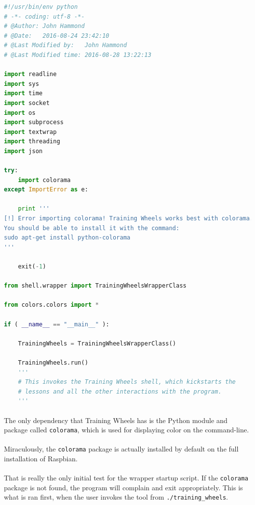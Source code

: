 \documentclass[11pt]{article}
\begin{document}
	\begin{lstlisting}[language=Python]
#!/usr/bin/env python
# -*- coding: utf-8 -*-
# @Author: John Hammond
# @Date:   2016-08-24 23:42:10
# @Last Modified by:   John Hammond
# @Last Modified time: 2016-08-28 13:22:13

import readline
import sys
import time
import socket
import os
import subprocess
import textwrap
import threading
import json

try:
	import colorama
except ImportError as e:

	print '''
[!] Error importing colorama! Training Wheels works best with colorama. 
You should be able to install it with the command:
sudo apt-get install python-colorama
'''

	exit(-1)

from shell.wrapper import TrainingWheelsWrapperClass

from colors.colors import *

if ( __name__ == "__main__" ):

	TrainingWheels = TrainingWheelsWrapperClass()

	TrainingWheels.run()
	'''
	# This invokes the Training Wheels shell, which kickstarts the
	# lessons and all the other interactions with the program.
	'''
	\end{lstlisting}	 


	\hrulefill

	\paragraph{} The only dependency that Training Wheels has is the Python module and package called \texttt{colorama}, which is used for displaying color on the command-line.

	\paragraph{} Miraculously, the \texttt{colorama} package is actually installed by default on the full installation of Raspbian.  

	\paragraph{} That is really the only initial test for the wrapper startup script. If the \texttt{colorama} package is not found, the program will complain and exit appropriately. This is what is ran first, when the user invokes the tool from \texttt{./training\_wheels}.
\end{document}
